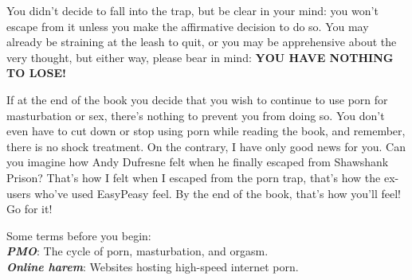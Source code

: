 \documentclass[easypeasy.tex]{subfiles}
\begin{document}
You didn't decide to fall into the trap, but be clear in your mind: you won't escape from it unless you make the affirmative decision to do so. You may already be straining at the leash to quit, or you may be apprehensive about the very thought, but either way, please bear in mind: \textbf{YOU HAVE NOTHING TO LOSE!}

If at the end of the book you decide that you wish to continue to use porn for masturbation or sex, there's nothing to prevent you from doing so. You don't even have to cut down or stop using porn while reading the book, and remember, there is no shock treatment. On the contrary, I have only good news for you. Can you imagine how Andy Dufresne felt when he finally escaped from Shawshank Prison? That's how I felt when I escaped from the porn trap, that's how the ex-users who've used EasyPeasy feel. By the end of the book, that's how you'll feel! Go for it!

Some terms before you begin:\\
{\small \textbf{\textit{PMO}}: The cycle of porn, masturbation, and orgasm.\\
  \textbf{\textit{Online harem}}: Websites hosting high-speed internet porn.
  }
\end{document}
